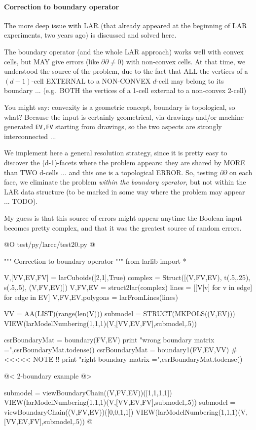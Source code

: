 \documentclass[11pt,oneside]{article}    %
\begin{document}
\paragraph{Correction to boundary operator}
The more deep issue with LAR (that already appeared at the beginning of LAR experiments, two years ago) is discussed and solved here.

The boundary operator (and the whole LAR approach) works well with convex cells, but MAY give errors (like $\partial\partial \not= 0$) with non-convex cells. At that time, we understood the source of the problem, due to the fact that ALL the vertices of a $(d-1)$-cell  EXTERNAL to a NON-CONVEX $d$-cell may belong to its boundary ... (e.g.~BOTH the vertices of a 1-cell external to a non-convex 2-cell)

You might say: convexity is a geometric concept, boundary is topological, so what? 
Because the input is certainly geometrical, via drawings and/or machine generated \texttt{EV,FV} starting from drawings, so the two aspects are strongly interconnected ... 

We implement here a general resolution strategy, since it is pretty  easy to discover the (d-1)-facets where the problem appears:  they are shared by MORE than TWO d-cells ... and this one is a topological ERROR. So, testing $\partial\partial$ on each face, we eliminate the problem \emph{within the boundary operator}, but not within the LAR data structure (to be marked in some way where the problem may appear ... TODO).

My guess is that this source of errors might appear anytime the Boolean input becomes pretty complex, and that it was the greatest source of random errors. 

@O test/py/larcc/test20.py
@{""" Correction to boundary operator """
from larlib import *

V,[VV,EV,FV] = larCuboids([2,1],True)
complex = Struct([(V,FV,EV), t(.5,.25), s(.5,.5), (V,FV,EV)])
V,FV,EV = struct2lar(complex)
lines = [[V[v] for v in edge] for edge in EV]
V,FV,EV,polygons = larFromLines(lines)

VV = AA(LIST)(range(len(V)))
submodel = STRUCT(MKPOLS((V,EV)))
VIEW(larModelNumbering(1,1,1)(V,[VV,EV,FV],submodel,.5)) 

csrBoundaryMat = boundary(FV,EV)
print "wrong boundary matrix =",csrBoundaryMat.todense()
csrBoundaryMat = boundary1(FV,EV,VV)  # <<<<< NOTE !!
print "right boundary matrix =",csrBoundaryMat.todense()

@< 2-boundary example @>

submodel = viewBoundaryChain((V,FV,EV))([1,1,1,1])
VIEW(larModelNumbering(1,1,1)(V,[VV,EV,FV],submodel,.5)) 
submodel = viewBoundaryChain((V,FV,EV))([0,0,1,1])
VIEW(larModelNumbering(1,1,1)(V,[VV,EV,FV],submodel,.5)) 
@}
\end{document}
